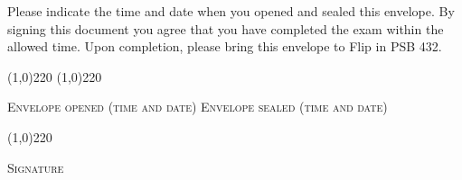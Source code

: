 \documentclass[12pt]{article}
\begin{document}
\vspace{.7 cm}

\noindent Please indicate the time and date when you opened and sealed this envelope. 
%
By signing this document you agree that you have completed the exam within the allowed time.
%
Upon completion, please bring this envelope to Flip in PSB 432.
\vspace{2em}

\line(1,0){220} \qquad \line(1,0){220} 

\textsc{Envelope opened (time and date)}
\hspace{1.1cm}
\textsc{Envelope sealed (time and date)}


%
%


\vspace{2em}

\line(1,0){220} 

\textsc{Signature}
\end{document}
